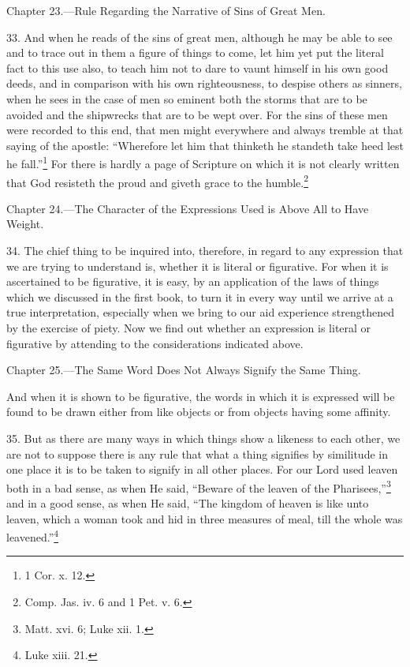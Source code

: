 
Chapter 23.—Rule Regarding the Narrative of Sins of Great Men.

33. And when he reads of the sins of great men, although he may be able to see and to trace out in them a figure of things to come, let him yet put the literal fact to this use also, to teach him not to dare to vaunt himself in his own good deeds, and in comparison with his own righteousness, to despise others as sinners, when he sees in the case of men so eminent both the storms that are to be avoided and the shipwrecks that are to be wept over. For the sins of these men were recorded to this end, that men might everywhere and always tremble at that saying of the apostle: “Wherefore let him that thinketh he standeth take heed lest he fall.”\footnote{1 Cor. x. 12.} For there is hardly a page of Scripture on which it is not clearly written that God resisteth the proud and giveth grace to the humble.\footnote{Comp. Jas. iv. 6 and 1 Pet. v. 6.}


Chapter 24.—The Character of the Expressions Used is Above All to Have Weight.

34. The chief thing to be inquired into, therefore, in regard to any expression that we are trying to understand is, whether it is literal or figurative. For when it is ascertained to be figurative, it is easy, by an application of the laws of things which we discussed in the first book, to turn it in every way until we arrive at a true interpretation, especially when we bring to our aid experience strengthened by the exercise of piety. Now we find out whether an expression is literal or figurative by attending to the considerations indicated above.


Chapter 25.—The Same Word Does Not Always Signify the Same Thing.

And when it is shown to be figurative, the words in which it is expressed will be found to be drawn either from like objects or from objects having some affinity.

35. But as there are many ways in which things show a likeness to each other, we are not to suppose there is any rule that what a thing signifies by similitude in one place it is to be taken to signify in all other places. For our Lord used leaven both in a bad sense, as when He said, “Beware of the leaven of the Pharisees,”\footnote{Matt. xvi. 6; Luke xii. 1.} and in a good sense, as when He said, “The kingdom of heaven is like unto leaven, which a woman took and hid in three measures of meal, till the whole was leavened.”\footnote{Luke xiii. 21.}

